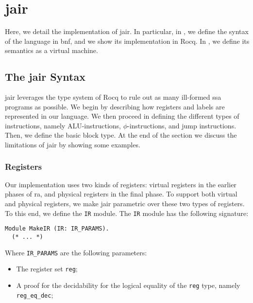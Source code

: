 
\chapter{\gls{jair}}
\label{cha:jair}

Here, we detail the implementation of \gls{jair}. In particular, in , we define the syntax of the language in \gls{bnf}, and we show its implementation in Rocq. In , we define its semantics as a virtual machine.

\section{The \gls{jair} Syntax}
\label{sec:jair-syntax}

\gls{jair} leverages the type system of Rocq to rule out as many ill-formed \gls{ssa} programs as possible. We begin by describing how registers and labels are represented in our language. We then proceed in defining the different types of instructions, namely ALU-instructions, $\phi$-instructions, and jump instructions. Then, we define the basic block type.
At the end of the section we discuss the limitations of \gls{jair} by showing some examples.

\subsection{Registers}

Our implementation uses two kinds of registers: virtual registers in the earlier phases of \gls{ra}, and physical registers in the final phase. To support both virtual and physical registers, we make \gls{jair} parametric over these two types of registers. To this end, we define the \texttt{IR} module. The \texttt{IR} module has the following signature:

\begin{lstlisting}[style=Rocq]
Module MakeIR (IR: IR_PARAMS).
  (* ... *)
\end{lstlisting}

Where \texttt{IR\_PARAMS} are the following parameters:
\begin{itemize}
    \item The register set \texttt{reg};
    \item A proof for the decidability for the logical equality of the \texttt{reg} type, namely \texttt{reg\_eq\_dec};
\end{itemize}

